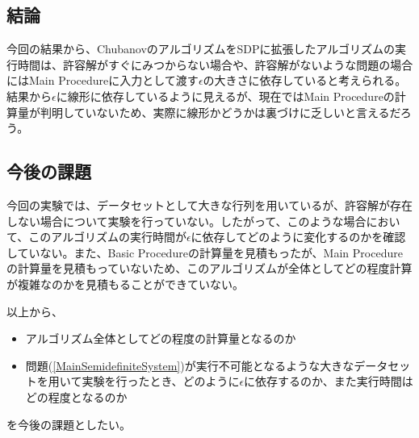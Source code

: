\subsection{結論}
今回の結果から、ChubanovのアルゴリズムをSDPに拡張したアルゴリズムの実行時間は、許容解がすぐにみつからない場合や、許容解がないような問題の場合にはMain Procedureに入力として渡す$\epsilon$の大きさに依存していると考えられる。結果から$\epsilon$に線形に依存しているように見えるが、現在ではMain Procedureの計算量が判明していないため、実際に線形かどうかは裏づけに乏しいと言えるだろう。

\subsection{今後の課題}
今回の実験では、データセットとして大きな行列を用いているが、許容解が存在しない場合について実験を行っていない。したがって、このような場合において、このアルゴリズムの実行時間が$\epsilon$に依存してどのように変化するのかを確認していない。また、Basic Procedureの計算量を見積もったが、Main Procedureの計算量を見積もっていないため、このアルゴリズムが全体としてどの程度計算が複雑なのかを見積もることができていない。

以上から、
\begin{itemize}
  \item アルゴリズム全体としてどの程度の計算量となるのか
  \item 問題(\ref{MainSemidefiniteSystem})が実行不可能となるような大きなデータセットを用いて実験を行ったとき、どのように$\epsilon$に依存するのか、また実行時間はどの程度となるのか
\end{itemize}
を今後の課題としたい。
